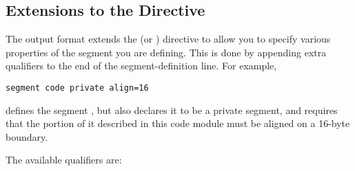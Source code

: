 \subsection{ Extensions to the  Directive}
\label{subsec:objseg}

The  output format extends the  (or )
directive to allow you to specify various properties of the segment
you are defining. This is done by appending extra qualifiers to the
end of the segment-definition line. For example,

\begin{lstlisting}
segment code private align=16
\end{lstlisting}

defines the segment , but also declares it to be a private
segment, and requires that the portion of it described in this code
module must be aligned on a 16-byte boundary.

The available qualifiers are:

%


